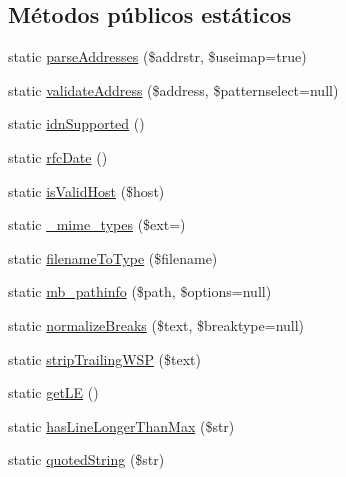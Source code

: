 \subsection*{Métodos públicos estáticos}
\begin{DoxyCompactItemize}
\item 
static \hyperlink{classPHPMailer_1_1PHPMailer_1_1PHPMailer_a36599ff70fa96868d74315965c1cfa65}{parse\+Addresses} (\$addrstr, \$useimap=true)
\item 
static \hyperlink{classPHPMailer_1_1PHPMailer_1_1PHPMailer_abc9724fcd40217503b3dcb5062791e3b}{validate\+Address} (\$address, \$patternselect=null)
\item 
static \hyperlink{classPHPMailer_1_1PHPMailer_1_1PHPMailer_a6f89dbfadb825aaf98a4589da298a20e}{idn\+Supported} ()
\item 
static \hyperlink{classPHPMailer_1_1PHPMailer_1_1PHPMailer_a1c35f9ec17924309c683f123856866de}{rfc\+Date} ()
\item 
static \hyperlink{classPHPMailer_1_1PHPMailer_1_1PHPMailer_a9396e56991c20b230e9f7a7fb54db64b}{is\+Valid\+Host} (\$host)
\item 
static \hyperlink{classPHPMailer_1_1PHPMailer_1_1PHPMailer_a53ddd3a03dd163fbc8397005770304ce}{\+\_\+mime\+\_\+types} (\$ext=\textquotesingle{}\textquotesingle{})
\item 
static \hyperlink{classPHPMailer_1_1PHPMailer_1_1PHPMailer_ad64d9facc15ec7c747f629db8ddf1c0a}{filename\+To\+Type} (\$filename)
\item 
static \hyperlink{classPHPMailer_1_1PHPMailer_1_1PHPMailer_a0715e35925a83d7dc049847b6307002e}{mb\+\_\+pathinfo} (\$path, \$options=null)
\item 
static \hyperlink{classPHPMailer_1_1PHPMailer_1_1PHPMailer_a8e42bab127101be26130a254a271ef3c}{normalize\+Breaks} (\$text, \$breaktype=null)
\item 
static \hyperlink{classPHPMailer_1_1PHPMailer_1_1PHPMailer_a85a2df0a82e8ac9fd4f8a1eea24b871c}{strip\+Trailing\+W\+SP} (\$text)
\item 
static \hyperlink{classPHPMailer_1_1PHPMailer_1_1PHPMailer_a0f0a1a36d81cad116227ba451cdb00b3}{get\+LE} ()
\item 
static \hyperlink{classPHPMailer_1_1PHPMailer_1_1PHPMailer_af817d5f3c045cebb0385ca1a41020ff9}{has\+Line\+Longer\+Than\+Max} (\$str)
\item 
static \hyperlink{classPHPMailer_1_1PHPMailer_1_1PHPMailer_a91506be40a2d045a2429cb3c770fc921}{quoted\+String} (\$str)
\end{DoxyCompactItemize}

